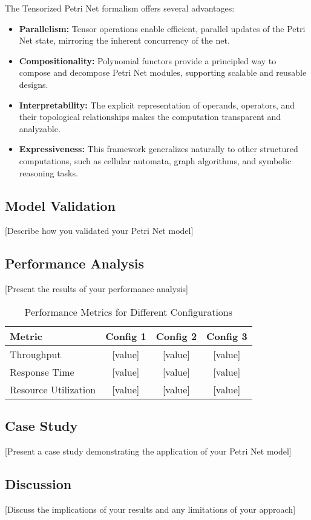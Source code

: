 \label{sec:results}

The Tensorized Petri Net formalism offers several advantages:

\begin{itemize}
    \item \textbf{Parallelism:} Tensor operations enable efficient, parallel updates of the Petri Net state, mirroring the inherent concurrency of the net.
    \item \textbf{Compositionality:} Polynomial functors provide a principled way to compose and decompose Petri Net modules, supporting scalable and reusable designs.
    \item \textbf{Interpretability:} The explicit representation of operands, operators, and their topological relationships makes the computation transparent and analyzable.
    \item \textbf{Expressiveness:} This framework generalizes naturally to other structured computations, such as cellular automata, graph algorithms, and symbolic reasoning tasks.
\end{itemize}

\subsection{Model Validation}

[Describe how you validated your Petri Net model]

\subsection{Performance Analysis}

[Present the results of your performance analysis]

\begin{table}[htbp]
\centering
\caption{Performance Metrics for Different Configurations}
\label{tab:performance}
\begin{tabular}{@{}lccc@{}}
\toprule
\textbf{Metric} & \textbf{Config 1} & \textbf{Config 2} & \textbf{Config 3} \\
\midrule
Throughput & [value] & [value] & [value] \\
Response Time & [value] & [value] & [value] \\
Resource Utilization & [value] & [value] & [value] \\
\bottomrule
\end{tabular}
\end{table}

\subsection{Case Study}

[Present a case study demonstrating the application of your Petri Net model]

\subsection{Discussion}

[Discuss the implications of your results and any limitations of your approach]